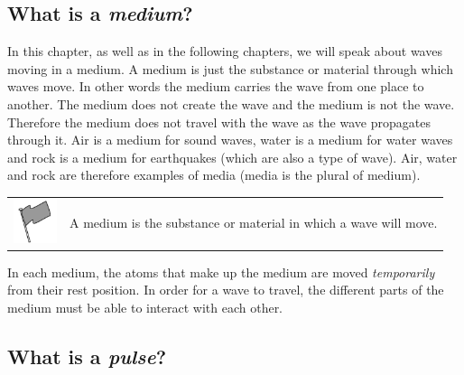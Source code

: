            \subsection{ What is a \textsl{medium}?}
            \nopagebreak
      \label{m38801*id312816}In this chapter, as well as in the following chapters, we will speak about waves moving in a medium. A medium is just the substance or material through which waves move. In other words the medium carries the wave from one place to another. The medium does not create the wave and the medium is not the wave. Therefore the medium does not travel with the wave as the wave propagates through it. Air is a medium for sound waves, water is a medium for water waves and rock is a medium for earthquakes (which are also a type of wave). Air, water and rock are therefore examples of media (media is the plural of medium).\par 
\label{m38801*fhsst!!!underscore!!!id51}\begin{definition}
	  \begin{tabular*}{15 cm}{m{15 mm}m{}}
	\hspace*{-50pt}  \includegraphics[width=0.5in]{col11305.imgs/psflag2.png}   & \Definition{   \label{id2434692}\textbf{ Medium }} { \label{m38801*meaningfhsst!!!underscore!!!id51}
      \label{m38801*id312830}A medium is the substance or material in which a wave will move. \par 
       } 
      \end{tabular*}
      \end{definition}
      \label{m38801*id312841}In each medium, the atoms that make up the medium are moved \textsl{temporarily} from their rest position. In order for a wave to travel, the different parts of the medium must be able to interact with each other.\par 
    \label{m38801*cid4}
            \subsection{ What is a \textsl{pulse}?}
            \nopagebreak
            \label{m38801*secfhsst!!!underscore!!!id58}
